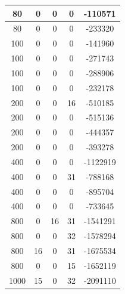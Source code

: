 \documentclass[a4paper]{article}
\begin{document}
\begin{table}[]
\begin{minipage}[b]{10cm}
\begin{tabular}{|c|c|c|c|c|}
80            & 0              & 0                   & 0                & -110571      \\ \hline
80            & 0              & 0                   & 0                & -233320      \\ \hline
100           & 0              & 0                   & 0                & -141960      \\ \hline
100           & 0              & 0                   & 0                & -271743      \\ \hline
100           & 0              & 0                   & 0                & -288906      \\ \hline
100           & 0              & 0                   & 0                & -232178      \\ \hline
200           & 0              & 0                   & 16               & -510185      \\ \hline
200           & 0              & 0                   & 0                & -515136      \\ \hline
200           & 0              & 0                   & 0                & -444357      \\ \hline
200           & 0              & 0                   & 0                & -393278      \\ \hline
400           & 0              & 0                   & 0                & -1122919     \\ \hline
400           & 0              & 0                   & 31               & -788168      \\ \hline
400           & 0              & 0                   & 0                & -895704      \\ \hline
400           & 0              & 0                   & 0                & -733645      \\ \hline
800           & 0              & 16                  & 31               & -1541291     \\ \hline
800           & 0              & 0                   & 32               & -1578294     \\ \hline
800           & 16             & 0                   & 31               & -1675534     \\ \hline
800           & 0              & 0                   & 15               & -1652119     \\ \hline
1000          & 15             & 0                   & 32               & -2091110     \\ \hline

\end{tabular}
\end{minipage}
\end{table}
\end{document}
